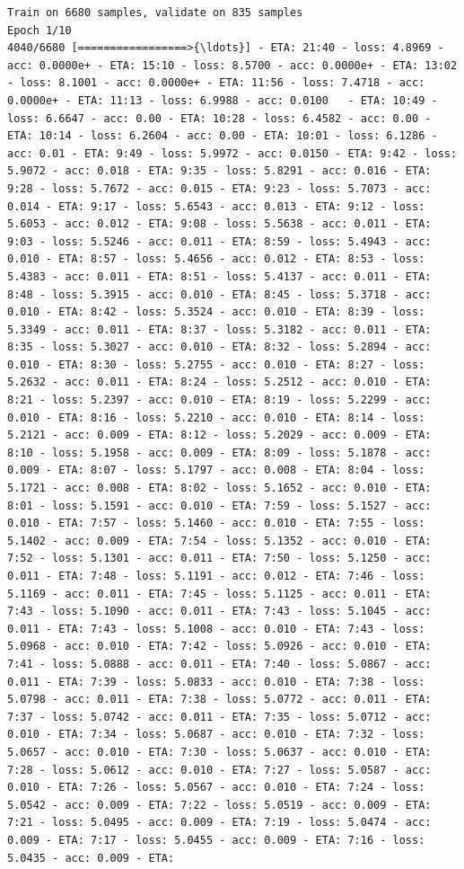 \documentclass[11pt]{article}
\begin{document}
    \begin{Verbatim}[commandchars=\\\{\}]
Train on 6680 samples, validate on 835 samples
Epoch 1/10
4040/6680 [=================>{\ldots}] - ETA: 21:40 - loss: 4.8969 - acc: 0.0000e+ - ETA: 15:10 - loss: 8.5700 - acc: 0.0000e+ - ETA: 13:02 - loss: 8.1001 - acc: 0.0000e+ - ETA: 11:56 - loss: 7.4718 - acc: 0.0000e+ - ETA: 11:13 - loss: 6.9988 - acc: 0.0100   - ETA: 10:49 - loss: 6.6647 - acc: 0.00 - ETA: 10:28 - loss: 6.4582 - acc: 0.00 - ETA: 10:14 - loss: 6.2604 - acc: 0.00 - ETA: 10:01 - loss: 6.1286 - acc: 0.01 - ETA: 9:49 - loss: 5.9972 - acc: 0.0150 - ETA: 9:42 - loss: 5.9072 - acc: 0.018 - ETA: 9:35 - loss: 5.8291 - acc: 0.016 - ETA: 9:28 - loss: 5.7672 - acc: 0.015 - ETA: 9:23 - loss: 5.7073 - acc: 0.014 - ETA: 9:17 - loss: 5.6543 - acc: 0.013 - ETA: 9:12 - loss: 5.6053 - acc: 0.012 - ETA: 9:08 - loss: 5.5638 - acc: 0.011 - ETA: 9:03 - loss: 5.5246 - acc: 0.011 - ETA: 8:59 - loss: 5.4943 - acc: 0.010 - ETA: 8:57 - loss: 5.4656 - acc: 0.012 - ETA: 8:53 - loss: 5.4383 - acc: 0.011 - ETA: 8:51 - loss: 5.4137 - acc: 0.011 - ETA: 8:48 - loss: 5.3915 - acc: 0.010 - ETA: 8:45 - loss: 5.3718 - acc: 0.010 - ETA: 8:42 - loss: 5.3524 - acc: 0.010 - ETA: 8:39 - loss: 5.3349 - acc: 0.011 - ETA: 8:37 - loss: 5.3182 - acc: 0.011 - ETA: 8:35 - loss: 5.3027 - acc: 0.010 - ETA: 8:32 - loss: 5.2894 - acc: 0.010 - ETA: 8:30 - loss: 5.2755 - acc: 0.010 - ETA: 8:27 - loss: 5.2632 - acc: 0.011 - ETA: 8:24 - loss: 5.2512 - acc: 0.010 - ETA: 8:21 - loss: 5.2397 - acc: 0.010 - ETA: 8:19 - loss: 5.2299 - acc: 0.010 - ETA: 8:16 - loss: 5.2210 - acc: 0.010 - ETA: 8:14 - loss: 5.2121 - acc: 0.009 - ETA: 8:12 - loss: 5.2029 - acc: 0.009 - ETA: 8:10 - loss: 5.1958 - acc: 0.009 - ETA: 8:09 - loss: 5.1878 - acc: 0.009 - ETA: 8:07 - loss: 5.1797 - acc: 0.008 - ETA: 8:04 - loss: 5.1721 - acc: 0.008 - ETA: 8:02 - loss: 5.1652 - acc: 0.010 - ETA: 8:01 - loss: 5.1591 - acc: 0.010 - ETA: 7:59 - loss: 5.1527 - acc: 0.010 - ETA: 7:57 - loss: 5.1460 - acc: 0.010 - ETA: 7:55 - loss: 5.1402 - acc: 0.009 - ETA: 7:54 - loss: 5.1352 - acc: 0.010 - ETA: 7:52 - loss: 5.1301 - acc: 0.011 - ETA: 7:50 - loss: 5.1250 - acc: 0.011 - ETA: 7:48 - loss: 5.1191 - acc: 0.012 - ETA: 7:46 - loss: 5.1169 - acc: 0.011 - ETA: 7:45 - loss: 5.1125 - acc: 0.011 - ETA: 7:43 - loss: 5.1090 - acc: 0.011 - ETA: 7:43 - loss: 5.1045 - acc: 0.011 - ETA: 7:43 - loss: 5.1008 - acc: 0.010 - ETA: 7:43 - loss: 5.0968 - acc: 0.010 - ETA: 7:42 - loss: 5.0926 - acc: 0.010 - ETA: 7:41 - loss: 5.0888 - acc: 0.011 - ETA: 7:40 - loss: 5.0867 - acc: 0.011 - ETA: 7:39 - loss: 5.0833 - acc: 0.010 - ETA: 7:38 - loss: 5.0798 - acc: 0.011 - ETA: 7:38 - loss: 5.0772 - acc: 0.011 - ETA: 7:37 - loss: 5.0742 - acc: 0.011 - ETA: 7:35 - loss: 5.0712 - acc: 0.010 - ETA: 7:34 - loss: 5.0687 - acc: 0.010 - ETA: 7:32 - loss: 5.0657 - acc: 0.010 - ETA: 7:30 - loss: 5.0637 - acc: 0.010 - ETA: 7:28 - loss: 5.0612 - acc: 0.010 - ETA: 7:27 - loss: 5.0587 - acc: 0.010 - ETA: 7:26 - loss: 5.0567 - acc: 0.010 - ETA: 7:24 - loss: 5.0542 - acc: 0.009 - ETA: 7:22 - loss: 5.0519 - acc: 0.009 - ETA: 7:21 - loss: 5.0495 - acc: 0.009 - ETA: 7:19 - loss: 5.0474 - acc: 0.009 - ETA: 7:17 - loss: 5.0455 - acc: 0.009 - ETA: 7:16 - loss: 5.0435 - acc: 0.009 - ETA: 
\end{Verbatim}
\end{document}
